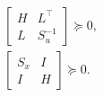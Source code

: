 \begin{framed}
\begin{subequations}
\begin{gather*}
		\\
			\begin{bmatrix}
				H & L^\top \\
				L & S_u^{-1}
			\end{bmatrix} \succeq 0,
			\\
			\begin{bmatrix}
				S_x & I \\
				I & H
			\end{bmatrix} \succeq 0.
		\end{gather*}
	\end{subequations}


	\vspace{0.5em}
\end{framed}
